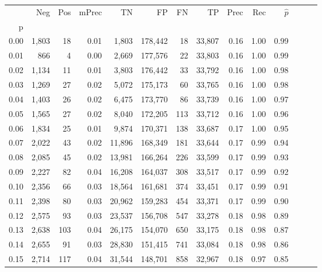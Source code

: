 \begin{tabular}{rrrrrrrrrrrrrr}
\toprule
{} &    Neg &  Pos & mPrec &       TN &       FP &      FN &      TP &  Prec &   Rec & $\hat{p}$ \\
p    &        &      &       &          &          &         &         &       &       &           \\
\midrule
0.00 &  1,803 &   18 &  0.01 &    1,803 &  178,442 &      18 &  33,807 &  0.16 &  1.00 &      0.99 \\
0.01 &    866 &    4 &  0.00 &    2,669 &  177,576 &      22 &  33,803 &  0.16 &  1.00 &      0.99 \\
0.02 &  1,134 &   11 &  0.01 &    3,803 &  176,442 &      33 &  33,792 &  0.16 &  1.00 &      0.98 \\
0.03 &  1,269 &   27 &  0.02 &    5,072 &  175,173 &      60 &  33,765 &  0.16 &  1.00 &      0.98 \\
0.04 &  1,403 &   26 &  0.02 &    6,475 &  173,770 &      86 &  33,739 &  0.16 &  1.00 &      0.97 \\
0.05 &  1,565 &   27 &  0.02 &    8,040 &  172,205 &     113 &  33,712 &  0.16 &  1.00 &      0.96 \\
0.06 &  1,834 &   25 &  0.01 &    9,874 &  170,371 &     138 &  33,687 &  0.17 &  1.00 &      0.95 \\
0.07 &  2,022 &   43 &  0.02 &   11,896 &  168,349 &     181 &  33,644 &  0.17 &  0.99 &      0.94 \\
0.08 &  2,085 &   45 &  0.02 &   13,981 &  166,264 &     226 &  33,599 &  0.17 &  0.99 &      0.93 \\
0.09 &  2,227 &   82 &  0.04 &   16,208 &  164,037 &     308 &  33,517 &  0.17 &  0.99 &      0.92 \\
0.10 &  2,356 &   66 &  0.03 &   18,564 &  161,681 &     374 &  33,451 &  0.17 &  0.99 &      0.91 \\
0.11 &  2,398 &   80 &  0.03 &   20,962 &  159,283 &     454 &  33,371 &  0.17 &  0.99 &      0.90 \\
0.12 &  2,575 &   93 &  0.03 &   23,537 &  156,708 &     547 &  33,278 &  0.18 &  0.98 &      0.89 \\
0.13 &  2,638 &  103 &  0.04 &   26,175 &  154,070 &     650 &  33,175 &  0.18 &  0.98 &      0.87 \\
0.14 &  2,655 &   91 &  0.03 &   28,830 &  151,415 &     741 &  33,084 &  0.18 &  0.98 &      0.86 \\
0.15 &  2,714 &  117 &  0.04 &   31,544 &  148,701 &     858 &  32,967 &  0.18 &  0.97 &      0.85 \\

\end{tabular}
